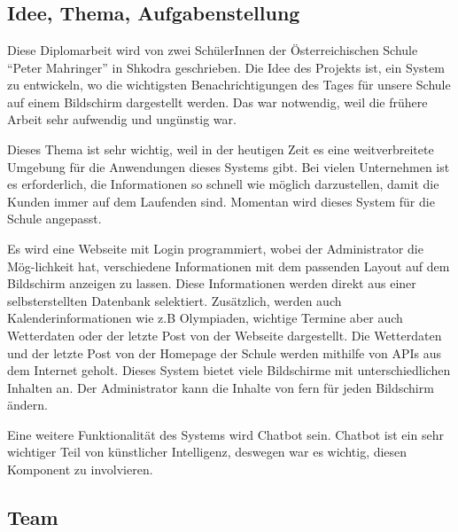 \chapter{\docname}
\label{\docname}

\section{Idee, Thema, Aufgabenstellung}
Diese Diplomarbeit wird von zwei Sch\"{u}lerInnen der \"{O}sterreichischen Schule \textquotedblleft{}Peter Mahringer\textquotedblright{} in Shkodra geschrieben. Die Idee des Projekts ist, ein System zu entwickeln, wo die wichtigsten Benachrichtigungen des Tages f\"{u}r unsere Schule auf einem Bildschirm dargestellt werden. Das war notwendig, weil die fr\"{u}here Arbeit sehr aufwendig und ung\"{u}nstig war.  

Dieses Thema ist sehr wichtig, weil in der heutigen Zeit es eine weitverbreitete Umgebung f\"{u}r die Anwendungen dieses Systems gibt. Bei vielen Unternehmen ist es erforderlich, die Informationen so schnell wie m\"{o}glich darzustellen, damit die Kunden immer auf dem Laufenden sind. Momentan wird dieses System f\"{u}r die Schule angepasst.  

Es wird eine Webseite mit Login programmiert, wobei der Administrator die M\"og-lichkeit hat, verschiedene Informationen mit dem passenden Layout auf dem Bildschirm anzeigen zu lassen. Diese Informationen werden direkt aus einer selbsterstellten Datenbank selektiert. Zus\"{a}tzlich, werden auch Kalenderinformationen wie z.B Olympiaden, wichtige Termine aber auch Wetterdaten oder der letzte Post von der Webseite dargestellt. Die Wetterdaten und der letzte Post von der Homepage der Schule werden mithilfe von APIs aus dem Internet geholt.  
Dieses System bietet viele Bildschirme mit unterschiedlichen Inhalten an. Der Administrator kann die Inhalte von fern f\"{u}r jeden Bildschirm \"{a}ndern. 

Eine weitere Funktionalit\"{a}t des Systems wird Chatbot sein. Chatbot ist ein sehr wichtiger Teil von k\"{u}nstlicher Intelligenz, deswegen war es wichtig, diesen Komponent zu involvieren. 


\section{Team}

